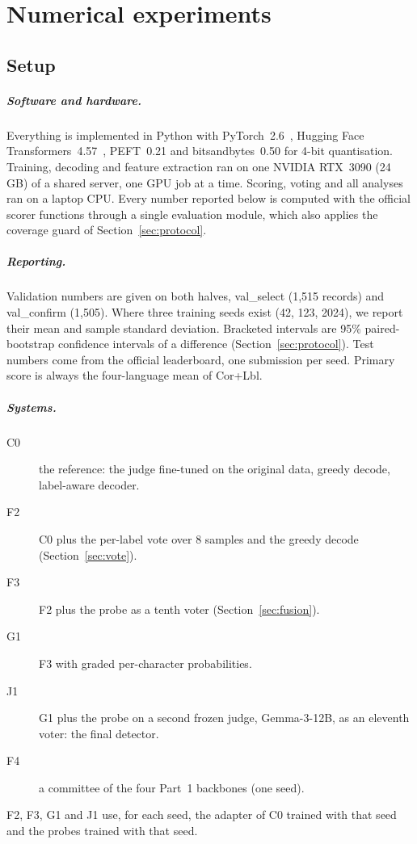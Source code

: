 \chapter{Numerical experiments}\label{chap:experiments}

\section{Setup}

\paragraph{Software and hardware.}
Everything is implemented in Python with PyTorch~2.6~\cite{paszke2019pytorch}, Hugging Face Transformers~4.57~\cite{DBLP:journals/corr/abs-1910-03771}, PEFT~0.21 and bitsandbytes~0.50 for 4-bit quantisation. Training, decoding and feature extraction ran on one NVIDIA RTX~3090 (24\,GB) of a shared server, one GPU job at a time. Scoring, voting and all analyses ran on a laptop CPU. Every number reported below is computed with the official scorer functions through a single evaluation module, which also applies the coverage guard of Section~\ref{sec:protocol}.

\paragraph{Reporting.}
Validation numbers are given on both halves, val\_select (1,515 records) and val\_confirm (1,505). Where three training seeds exist (42, 123, 2024), we report their mean and sample standard deviation. Bracketed intervals are 95\% paired-bootstrap confidence intervals of a difference (Section~\ref{sec:protocol}). Test numbers come from the official leaderboard, one submission per seed. Primary score is always the four-language mean of Cor+Lbl.

\paragraph{Systems.}
\begin{description}
    \item[C0] the reference: the judge fine-tuned on the original data, greedy decode, label-aware decoder.
    \item[F2] C0 plus the per-label vote over 8 samples and the greedy decode (Section~\ref{sec:vote}).
    \item[F3] F2 plus the probe as a tenth voter (Section~\ref{sec:fusion}).
    \item[G1] F3 with graded per-character probabilities.
    \item[J1] G1 plus the probe on a second frozen judge, Gemma-3-12B, as an eleventh voter: the final detector.
    \item[F4] a committee of the four Part~1 backbones (one seed).
\end{description}
F2, F3, G1 and J1 use, for each seed, the adapter of C0 trained with that seed and the probes trained with that seed.

